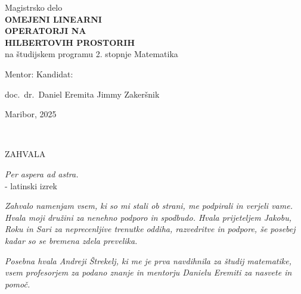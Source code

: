 \documentclass[12pt,a4paper,oneside,fleqn,openany]{book}
\begin{document}
\begin{center}
{\Large Magistrsko delo}\\
\vspace{0.5cm}
{\Huge \bfseries OMEJENI LINEARNI} \\ 
 \vspace{0.5cm} 
{\Huge \bfseries OPERATORJI NA} \\ 
\vspace{0.5cm} 
{\Huge \bfseries HILBERTOVIH PROSTORIH} \\
\vspace{0.5cm} 
{\Large na študijskem programu 2. stopnje Matematika}


\vspace{5cm}

\begin{flushleft}
Mentor:  Kandidat:


doc.\ dr.\ Daniel Eremita  Jimmy Zakeršnik 
\end{flushleft}


\vspace{1cm}
{\large Maribor, 2025}
\end{center}


\newpage
~

\begin{center}
\Large
ZAHVALA
\end{center}

\vspace{1cm}

\begin{flushright}
\textit{Per aspera ad astra.} \\ - latinski izrek
\end{flushright}

\vspace{2cm}

\begin{sloppypar}
\textit{Zahvalo namenjam vsem, ki so mi stali ob strani, me podpirali in verjeli vame. Hvala moji družini za nenehno podporo in spodbudo. Hvala prijeteljem Jakobu, Roku in Sari za neprecenljive trenutke oddiha, razvedritve in podpore, še posebej kadar so se bremena zdela prevelika.}
\end{sloppypar}

\begin{sloppypar}
\textit{Posebna hvala Andreji Štrekelj, ki me je prva navdihnila za študij matematike, vsem profesorjem za podano znanje in mentorju Danielu Eremiti za nasvete in pomoč.}
\end{sloppypar}
\end{document}
